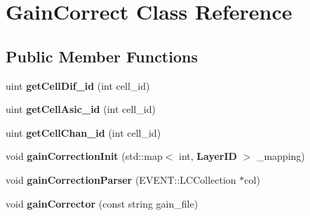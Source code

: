 \section{Gain\-Correct Class Reference}
\label{classGainCorrect}
\subsection*{Public Member Functions}
\begin{DoxyCompactItemize}
\item 
uint {\bfseries get\-Cell\-Dif\-\_\-id} (int cell\-\_\-id)\label{classGainCorrect_a0f6582bebdcb7c7e28a50b976b516889}

\item 
uint {\bfseries get\-Cell\-Asic\-\_\-id} (int cell\-\_\-id)\label{classGainCorrect_ad47b491a5cfc05d302bcfe89355139dc}

\item 
uint {\bfseries get\-Cell\-Chan\-\_\-id} (int cell\-\_\-id)\label{classGainCorrect_aadd9201c4bb5477ebd8c844c470870c5}

\item 
void {\bfseries gain\-Correction\-Init} (std\-::map$<$ int, {\bf Layer\-I\-D} $>$ \-\_\-mapping)\label{classGainCorrect_a9d22fc0d5f046f1a97b7924e76b0aeb3}

\item 
void {\bfseries gain\-Correction\-Parser} (E\-V\-E\-N\-T\-::\-L\-C\-Collection $\ast$col)\label{classGainCorrect_a6d1f995946c98bbe9320de624b57e32e}

\item 
void {\bfseries gain\-Corrector} (const string gain\-\_\-file)\label{classGainCorrect_a437c2fccc62f1ecf676f3fd2e510fa54}

\end{DoxyCompactItemize}

